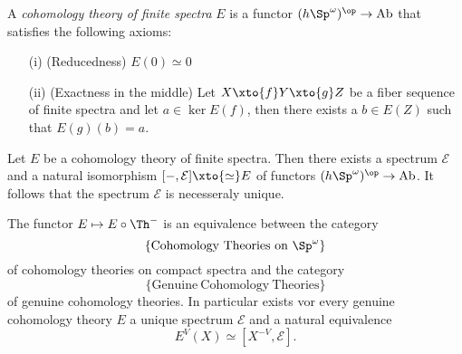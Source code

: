   \begin{definition}
    A \emph{cohomology theory of finite spectra} $E$ is a functor 
    $ (h \Sp^\omega)^\op \to \mathrm{Ab}$ that satisfies the following axioms:
    \begin{enumerate}
      \item[(i)](Reducedness) $E(0) \simeq 0$
      \item[(ii)](Exactness in the middle) Let $X \xto{f} Y \xto{g} Z$ be 
      a fiber sequence of finite spectra and let $a \in \ker E(f)$, 
      then there exists a $b \in E(Z)$ such that $E(g)(b) = a$.
    \end{enumerate}
  \end{definition}
  
  \begin{proposition}
    Let $E$ be a cohomology theory of finite spectra. Then there exists a spectrum 
    $\mathcal E$ and a natural isomorphism $[-, \mathcal E] \xto{\simeq} E$ of functors 
    $(h \Sp^\omega)^\op \to \mathrm{Ab}$.
    It follows that the spectrum $\mathcal E$ is necesseraly unique.
  \end{proposition}

  \begin{proposition}
    The functor $E \mapsto E \circ \Th^-$ is an equivalence between the category
    \[\{\mathrm{Cohomology\ Theories\ on\ }\Sp^\omega\}\] 
    of cohomology theories on compact spectra and 
    the category \[
        \{\mathrm{Genuine\ Cohomology\ Theories}\}
       \] of genuine cohomology theories.
    In particular exists vor every genuine cohomology theory $E$ a unique spectrum $\mathcal E$ and a natural 
    equivalence 
    \[
      E^V(X) \simeq [X^{-V}, \mathcal E]  .
    \]
  \end{proposition}

